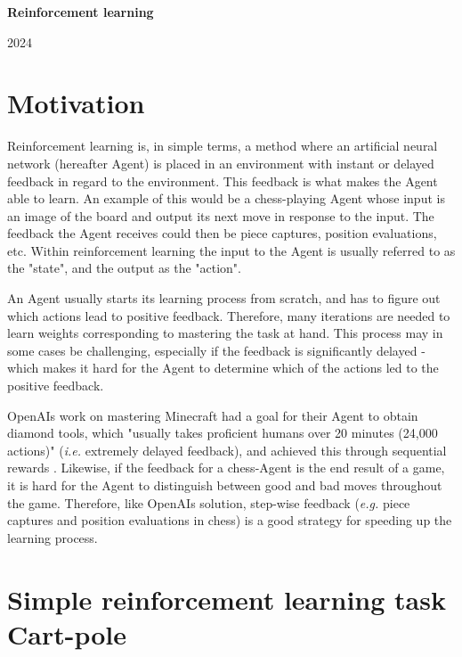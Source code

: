 \documentclass{article}
\begin{document}
\begin{center}
    \textbf{\LARGE Reinforcement learning}

    \vspace{0.2cm}
    
    2024

\end{center}

\section*{Motivation}

Reinforcement learning is, in simple terms, a method where an artificial neural network (hereafter Agent) is placed in an environment with instant or delayed feedback in regard to the environment. This feedback is what makes the Agent able to learn. An example of this would be a chess-playing Agent whose input is an image of the board and output its next move in response to the input. The feedback the Agent receives could then be piece captures, position evaluations, etc. Within reinforcement learning the input to the Agent is usually referred to as the "state", and the output as the "action".

An Agent usually starts its learning process from scratch, and has to figure out which actions lead to positive feedback. Therefore, many iterations are needed to learn weights corresponding to mastering the task at hand. This process may in some cases be challenging, especially if the feedback is significantly delayed - which makes it hard for the Agent to determine which of the actions led to the positive feedback.

OpenAIs work on mastering Minecraft had a goal for their Agent to obtain diamond tools, which "usually takes proficient humans over 20 minutes (24,000 actions)" (\textit{i.e.} extremely delayed feedback), and achieved this through sequential rewards \cite{Minecraft}. Likewise, if the feedback for a chess-Agent is the end result of a game, it is hard for the Agent to distinguish between good and bad moves throughout the game. Therefore, like OpenAIs solution, step-wise feedback (\textit{e.g.} piece captures and position evaluations in chess) is a good strategy for speeding up the learning process.

\section*{Simple reinforcement learning task \hfill Cart-pole}
\end{document}
